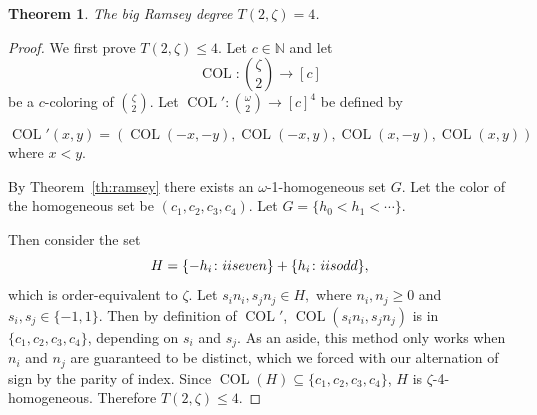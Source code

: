 \documentclass[11pt]{article}
\newcommand{\om}{\omega}
\newcommand{\setconcat}{+}
\newcommand{\COL}{\operatorname{COL}}
\newcommand{\N}{\mathbb{N}}
\newcommand{\numcolors}{c}
\theoremstyle{plain}
\newtheorem{theorem}{Theorem}[section]
\theoremstyle{definition}
\begin{document}
\begin{theorem}\label{the:Z2}
The big Ramsey degree $T(2,\zeta)=4$. 
\end{theorem}
\begin{proof}
We first prove $T(2,\zeta)\leq 4$. Let $\numcolors \in \N$ and let $$\COL\colon \binom{\zeta}{2}\to [\numcolors]$$
be a $\numcolors$-coloring of $\binom{\zeta}{2}$.
Let $\COL'\colon \binom{\omega}{2} \to [\numcolors]^4$ be defined by 

$$
\COL'(x,y) = (\COL(-x,-y), \COL(-x,y), \COL(x,-y), \COL(x,y))
$$ where $x < y.$

By Theorem~\ref{th:ramsey} there exists an $\om$-1-homogeneous set $G$. 
Let the color of the homogeneous set be $(c_1,c_2,c_3,c_4)$.
Let $G = \{h_0 < h_1 < \cdots \}$. 

Then consider the set $$H= \{-h_i \colon i \textnormal{ is even}\} \setconcat \{h_i \colon i \textnormal{ is odd}\},$$ which is order-equivalent to $\zeta$. Let $s_in_i, s_jn_j \in H,$ where $n_i,n_j\geq 0$ and $s_i,s_j \in \{-1,1\}$. Then by definition of $\COL'$, $\COL(s_in_i,s_jn_j)$ is in $\{c_1, c_2, c_3, c_4\}$, depending on $s_i$ and $s_j$. As an aside, this method only works when $n_i$ and $n_j$ are guaranteed to be distinct, which we forced with our alternation of sign by the parity of index.
Since $\COL(H)\subseteq \{c_1,c_2,c_3,c_4\}$, $H$ is $\zeta$-4-homogeneous.
Therefore $T(2,\zeta)\leq 4$.


\end{proof}
\end{document}
